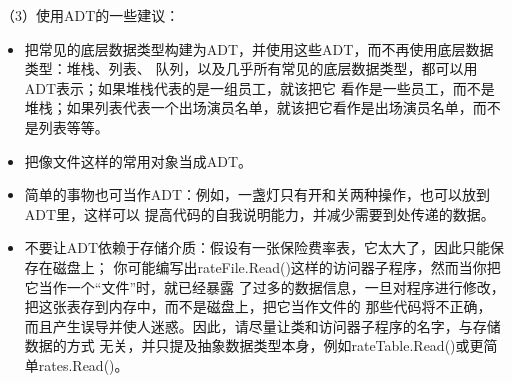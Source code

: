 \documentclass{article}
\begin{document}
\par
（3）使用ADT的一些建议：
\par
\begin{itemize}
    \item 把常见的底层数据类型构建为ADT，并使用这些ADT，而不再使用底层数据类型：堆栈、列表、
    队列，以及几乎所有常见的底层数据类型，都可以用ADT表示；如果堆栈代表的是一组员工，就该把它
    看作是一些员工，而不是堆栈；如果列表代表一个出场演员名单，就该把它看作是出场演员名单，而不是列表等等。
    \item 把像文件这样的常用对象当成ADT。
    \item 简单的事物也可当作ADT：例如，一盏灯只有开和关两种操作，也可以放到ADT里，这样可以
    提高代码的自我说明能力，并减少需要到处传递的数据。
    \item 不要让ADT依赖于存储介质：假设有一张保险费率表，它太大了，因此只能保存在磁盘上；
    你可能编写出rateFile.Read()这样的访问器子程序，然而当你把它当作一个“文件”时，就已经暴露
    了过多的数据信息，一旦对程序进行修改，把这张表存到内存中，而不是磁盘上，把它当作文件的
    那些代码将不正确，而且产生误导并使人迷惑。因此，请尽量让类和访问器子程序的名字，与存储数据的方式
    无关，并只提及抽象数据类型本身，例如rateTable.Read()或更简单rates.Read()。
\end{itemize}
\end{document}
